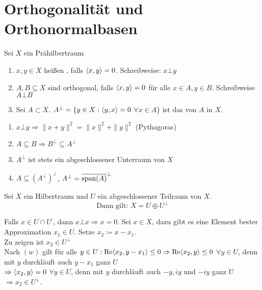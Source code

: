 


\section{Orthogonalität und Orthonormalbasen}


\begin{definition}
	Sei $X$ ein Prähilbertraum
	\begin{enumerate}[label=\alph*\upshape)]
		\item $x, y \in X$ hei{\ss}en , falls $\langle x, y \rangle = 0$. Schreibweise: $x \bot y$
		\item $A, B \subseteq X$ sind orthogonal, falls $\langle x, y \rangle = 0$ für alle $x \in A, y \in B$. Schreibweise $A \bot B$
		\item Sei $A \subset X$. $A^{\bot} = \{ y \in X: \langle y, x \rangle = 0$ $\forall x \in A \}$ ist das  von $A$ in $X$.
	\end{enumerate}
\end{definition}


\begin{bemerkung} \label{bem:16.2}
	\begin{enumerate}[label=\alph*\upshape)]
		\item $x \bot y \Rightarrow \| x + y \|^{2} = \| x \|^{2} + \| y \|^{2} $ (Pythagoras) 
		\item $A \subseteq B \Rightarrow B^{\bot} \subseteq A^{\bot}$
		\item $A^{\bot}$ ist stets ein abgeschlossener Unterraum von $X$
		\item $A \subseteq \left( A^{\bot} \right)^{\bot}$, $A^{\bot} = \overline{ \operatorname{span}(A) }^{\bot}$
	\end{enumerate}	
\end{bemerkung}


\begin{satz}[Orthogonalzerlegung]  \label{satz:13.6-Orthogonalzerlegung}
	Sei $X$ ein Hilbertraum und $U$ ein abgeschlossener Teilraum von $X$.
		\[ \text{Dann gilt: } X = U \oplus U^{\bot} \]
\end{satz}

\begin{beweis}
	Falls $x \in U \cap U^{\colon}$, dann $x \bot x \Rightarrow x = 0$. Sei $x \in X$, dazu gibt es eine Element bester Approximation $x_{1} \in U$. Setze $x_{2} \coloneqq x - x_{1}$. \\
	Zu zeigen ist $x_{2} \in U^{\bot}$ \\
	Nach \hyperref[eq:15.7.5-SkalarproductbestApproximation]{$(w)$} gilt für alle $y \in U: \mathop{\rm Re}\nolimits \langle x_{2}, y - x_{1} \rangle \leq 0 \Rightarrow \mathop{\rm Re}\nolimits \langle x_{2}, y \rangle \leq 0$ $\forall y \in U$, denn mit $y$ durchläuft auch $y - x_{1}$ ganz $U$ \\
	$\Rightarrow \langle x_{2}, y \rangle = 0$ $\forall y \in U$, denn mit $y$ durchläuft auch $-y, iy$ und $-iy$ ganz $U$ $\Rightarrow x_{2} \in U^{\bot}$.
\end{beweis}


